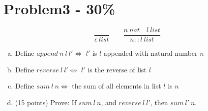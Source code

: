 \documentclass{article}
\newcommand{\answerboxbig}{
    \vspace{20cm} %
}
\begin{document}
\answerboxbig

\section*{Problem3 - 30\%}

\[
  \frac{}{\epsilon\ list}
  \qquad
  \frac{n\ nat \quad l\ list}{n::l\ list}
\]
\begin{enumerate}[(a)]
  \item Define $append\ n\ l\ l' \iff$ $l'$ is $l$ appended with natural number $n$
  \item Define $reverse\ l\ l' \iff$ $l'$ is the reverse of list $l$
  \item Define $sum\ l\ n \iff$ the sum of all elements in list $l$ is $n$
  \item (15 points) Prove: If $sum\ l\ n$, and $reverse\ l\ l'$, then $sum\ l'\ n$.
\end{enumerate}

\answerboxbig
\end{document}
